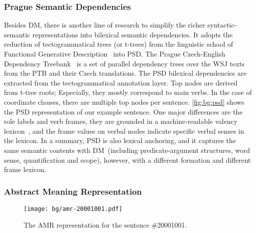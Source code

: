 \subsubsection{Prague Semantic Dependencies}
\label{sssec:bg:psd}
Besides DM, there is another line of research to simplify the richer
syntactic-semantic representations into bilexical semantic
dependencies. It adopts the reduction of tectogrammatical trees (or
t-trees) from the linguistic school of Functional Generative
Description~\citep[FGD,][]{Sga:Haj:Pan:86,hajic2012announcing} into
PSD. The Prague Czech-English Dependency
Treebank~\citep[PCEDT,][]{hajic2012announcing} is a set of parallel
dependency trees over the WSJ texts from the PTB and their Czech
translations. The PSD bilexical dependencies are extracted from the
tectogrammatical annotation layer. Top nodes are derived from t-tree
roots; Especially, they mostly correspond to main verbs. In the case
of coordinate clauses, there are multiple top nodes per
sentence. \autoref{fig:bg:psd} shows the PSD representation of our
example sentence. One major differences are the role labels and verb
frames, they are grounded in a machine-readable valency
lexicon~\citep{urevsova2016czengvallex}, and the frame values on
verbal nodes indicate specific verbal senses in the
lexicon. In a summary, PSD is also lexical anchoring, and it
  captures the same semantic contents with DM~(including
  predicate-argument structures, word sense, quantification and
  scope), however, with a different formation and different frame
  lexicon.



\subsubsection{Abstract Meaning Representation}
\label{ssec:bg:amr}
%
\begin{figure}[!tbp]
\begin{center}
\texttt{[image: bg/amr-20001001.pdf]}
\end{center}
\caption{\label{fig:bg:amr} The AMR representation for the sentence
  \#20001001.}
\end{figure}

